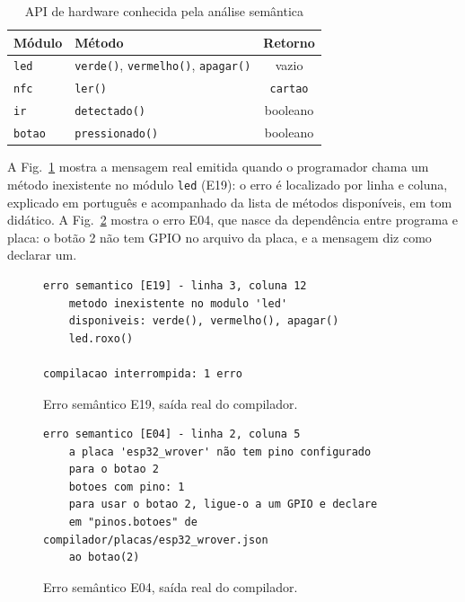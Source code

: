 \documentclass[conference]{IEEEtran}
\begin{document}
\begin{table}[htbp]
\caption{API de hardware conhecida pela análise semântica}
\begin{center}
\footnotesize
\begin{tabular}{llc}
\toprule
\textbf{Módulo} & \textbf{Método} & \textbf{Retorno} \\
\midrule
\texttt{led} & \texttt{verde()}, \texttt{vermelho()}, \texttt{apagar()} & vazio \\
\texttt{nfc} & \texttt{ler()} & \texttt{cartao} \\
\texttt{ir} & \texttt{detectado()} & booleano \\
\texttt{botao} & \texttt{pressionado()} & booleano \\
\bottomrule
\end{tabular}
\label{tab:api}
\end{center}
\end{table}

A Fig.~\ref{fig:erro} mostra a mensagem real emitida quando o programador
chama um método inexistente no módulo \texttt{led} (E19): o erro é localizado
por linha e coluna, explicado em português e acompanhado da lista de métodos
disponíveis, em tom didático. A Fig.~\ref{fig:erro2} mostra o erro E04, que
nasce da dependência entre programa e placa: o botão 2 não tem GPIO no arquivo
da placa, e a mensagem diz como declarar um.

\begin{figure}[htbp]
\centering
\begin{lstlisting}[basicstyle=\ttfamily\scriptsize, numbers=none, xleftmargin=0pt, framexleftmargin=0pt]
erro semantico [E19] - linha 3, coluna 12
    metodo inexistente no modulo 'led'
    disponiveis: verde(), vermelho(), apagar()
    led.roxo()

compilacao interrompida: 1 erro
\end{lstlisting}
\caption{Erro semântico E19, saída real do compilador.}
\label{fig:erro}
\end{figure}

\begin{figure}[htbp]
\centering
\begin{lstlisting}[basicstyle=\ttfamily\tiny, numbers=none, xleftmargin=0pt, framexleftmargin=0pt]
erro semantico [E04] - linha 2, coluna 5
    a placa 'esp32_wrover' não tem pino configurado
    para o botao 2
    botoes com pino: 1
    para usar o botao 2, ligue-o a um GPIO e declare
    em "pinos.botoes" de compilador/placas/esp32_wrover.json
    ao botao(2)
\end{lstlisting}
\caption{Erro semântico E04, saída real do compilador.}
\label{fig:erro2}
\end{figure}
\end{document}

